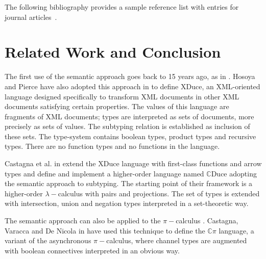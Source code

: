 \documentclass[runningheads]{llncs}
\begin{document}
The following bibliography provides
a sample reference list with entries for journal
articles~\cite{Dardha2017}.

\section{Related Work and Conclusion}
\label{sec:conclusion}
The first use of the semantic approach goes back to 15 years ago, as in \cite{Aiken,Damm}. Hosoya and Pierce have also adopted this approach in \cite{XML1,XML2,XML3} to define XDuce, an XML-oriented language designed specifically to transform XML documents in other XML documents satisfying certain properties. The values of this language are fragments of XML documents; types are interpreted as sets of documents, more precisely as sets of values. The subtyping relation is established as inclusion of these sets. The type-system contains boolean types, product types and recursive types. There are no function types and no functions in the language.

Castagna et al. in \cite{gentle,Cas05,FCB08} extend the XDuce language with first-class functions and arrow types and define and implement a higher-order language named $\mathbb{C}$Duce adopting the semantic approach to subtyping. The starting point of their framework is a higher-order $\lambda-$calculus with pairs and projections. The set of types is extended with intersection, union and negation types interpreted in a set-theoretic way.

The semantic approach can also be applied to the $\pi-$calculus \cite{milner,sangiorgi}. Castagna, Varacca and De Nicola in \cite{Cpi} have used this technique to define the $\mathbb{C}\pi$ language, a variant of the asynchronous $\pi-$calculus, where channel types are augmented with boolean connectives interpreted in an obvious way.


\newpage


\end{document}
